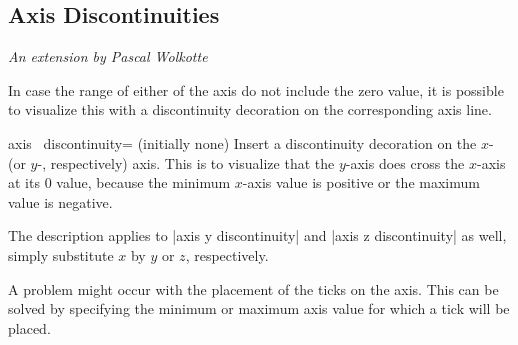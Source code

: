 \subsection{Axis Discontinuities}
\label{sec:axis:discontinuities}

{\small \emph{An extension by Pascal Wolkotte}}
\vspace{0.4cm}%

\noindent In case the range of either of the axis do not include the zero
value, it is possible to visualize this with a discontinuity decoration on the
corresponding axis line.

\begin{pgfplotsxykey}{axis \x\ discontinuity= (initially none)}
    Insert a discontinuity decoration on the $x$- (or $y$-, respectively) axis.
    This is to visualize that the $y$-axis does cross the $x$-axis at its $0$
    value, because the minimum $x$-axis value is positive or the maximum value
    is negative.

    The description applies to |axis y discontinuity| and
    |axis z discontinuity| as well, simply substitute $x$ by $y$ or $z$,
    respectively.
\begin{codeexample}[]
\end{codeexample}

\begin{codeexample}[]
\end{codeexample}
\end{pgfplotsxykey}

A problem might occur with the placement of the ticks on the axis. This can be
solved by specifying the minimum or maximum axis value for which a tick will be
placed.

